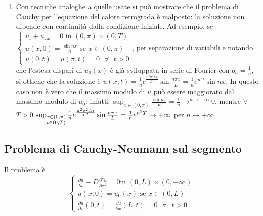 \documentclass{article}
\begin{document}
\begin{enumerate}
\item Con tecniche analoghe a quelle usate si pu\`{o} mostrare che il
problema di Cauchy per l'equazione del calore retrograda \`{e} malposto: la
soluzione non dipende con continuit\`{a} dalla condizione iniziale. Ad
esempio, se $\left\{ 
\begin{array}{c}
u_{t}+u_{xx}=0\text{ in }\left( 0,\pi \right) \times \left( 0,T\right) \\ 
u\left( x,0\right) =\frac{\sin nx}{n}\text{ se }x\in \left( 0,\pi \right) \\ 
u\left( 0,t\right) =u\left( \pi ,t\right) =0\text{ }\forall \text{ }t>0%
\end{array}%
\right. $, per separazione di variabili e notando che l'estesa dispari di $%
u_{0}\left( x\right) $ \`{e} gi\`{a} sviluppata in serie di Fourier con $%
b_{n}=\frac{1}{n}$, si ottiene che la soluzione \`{e} $u\left( x,t\right) =%
\frac{1}{n}e^{\frac{n^{2}\pi ^{2}Dt}{L^{2}}}\sin \frac{n\pi x}{L}=\frac{1}{n}%
e^{n^{2}t}\sin nx$. In questo caso non \`{e} vero che il massimo modulo di $%
u $ pu\`{o} essere maggiorato dal massimo modulo di $u_{0}$: infatti $%
\sup_{x\in \left( 0,\pi \right) }\frac{\sin nx}{n}=\frac{1}{n}\rightarrow
^{n\rightarrow +\infty }0$, mentre $\forall $ $T>0$ $\sup_{\substack{ x\in
\left( 0,\pi \right)  \\ t\in \left( 0,T\right) }}\frac{1}{n}e^{\frac{%
n^{2}\pi ^{2}Dt}{L^{2}}}\sin \frac{n\pi x}{L}=\frac{1}{n}e^{n^{2}T}%
\rightarrow +\infty $ per $n\rightarrow +\infty $.
\end{enumerate}

\subsection{Problema di Cauchy-Neumann sul segmento}

Il problema \`{e}%
\begin{equation*}
\left\{ 
\begin{array}{c}
\frac{\partial u}{\partial t}-D\frac{\partial ^{2}u}{\partial x^{2}}=0\text{
in }\left( 0,L\right) \times \left( 0,+\infty \right) \\ 
u\left( x,0\right) =u_{0}\left( x\right) \text{ se }x\in \left( 0,L\right)
\\ 
\frac{\partial u}{\partial x}\left( 0,t\right) =\frac{\partial u}{\partial x}%
\left( L,t\right) =0\text{ }\forall \text{ }t>0%
\end{array}%
\right.
\end{equation*}
\end{document}
